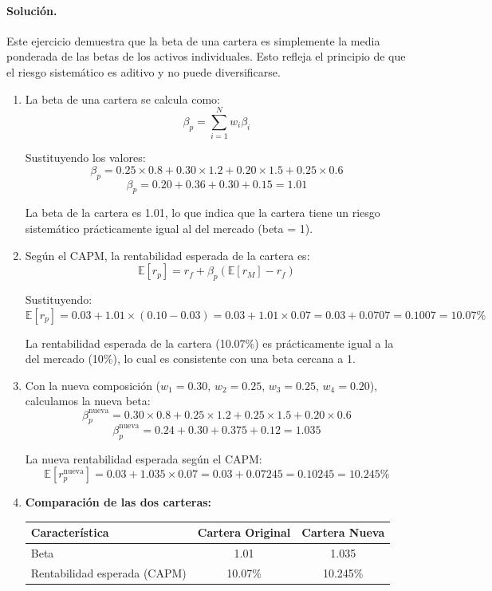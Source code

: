 \documentclass[12pt,a4paper]{article}
\newcommand{\E}{\mathbb{E}}
\newenvironment{solucion}{\paragraph{Solución.}}{}
\begin{document}
\begin{solucion}
Este ejercicio demuestra que la beta de una cartera es simplemente la media ponderada de las betas de los activos individuales. Esto refleja el principio de que el riesgo sistemático es aditivo y no puede diversificarse.

\begin{enumerate}[label=\alph*)]
  \item La beta de una cartera se calcula como:
  \[
  \beta_p = \sum_{i=1}^{N} w_i \beta_i
  \]
  
  Sustituyendo los valores:
  \[
  \beta_p = 0.25 \times 0.8 + 0.30 \times 1.2 + 0.20 \times 1.5 + 0.25 \times 0.6
  \]
  \[
  \beta_p = 0.20 + 0.36 + 0.30 + 0.15 = 1.01
  \]
  
  La beta de la cartera es 1.01, lo que indica que la cartera tiene un riesgo sistemático prácticamente igual al del mercado (beta = 1).

  \item Según el CAPM, la rentabilidad esperada de la cartera es:
  \[
  \E[r_p] = r_f + \beta_p (\E[r_M] - r_f)
  \]
  
  Sustituyendo:
  \[
  \E[r_p] = 0.03 + 1.01 \times (0.10 - 0.03) = 0.03 + 1.01 \times 0.07 = 0.03 + 0.0707 = 0.1007 = 10.07\%
  \]
  
  La rentabilidad esperada de la cartera (10.07\%) es prácticamente igual a la del mercado (10\%), lo cual es consistente con una beta cercana a 1.

  \item Con la nueva composición ($w_1 = 0.30$, $w_2 = 0.25$, $w_3 = 0.25$, $w_4 = 0.20$), calculamos la nueva beta:
  \[
  \beta_p^{\text{nueva}} = 0.30 \times 0.8 + 0.25 \times 1.2 + 0.25 \times 1.5 + 0.20 \times 0.6
  \]
  \[
  \beta_p^{\text{nueva}} = 0.24 + 0.30 + 0.375 + 0.12 = 1.035
  \]
  
  La nueva rentabilidad esperada según el CAPM:
  \[
  \E[r_p^{\text{nueva}}] = 0.03 + 1.035 \times 0.07 = 0.03 + 0.07245 = 0.10245 = 10.245\%
  \]

  \item \textbf{Comparación de las dos carteras:}
  
  \begin{center}
  \begin{tabular}{lcc}
  \toprule
  Característica & Cartera Original & Cartera Nueva \\
  \midrule
  Beta & 1.01 & 1.035 \\
  Rentabilidad esperada (CAPM) & 10.07\% & 10.245\% \\
  \bottomrule
  \end{tabular}
  \end{center}


\end{enumerate}
\end{solucion}
\end{document}
